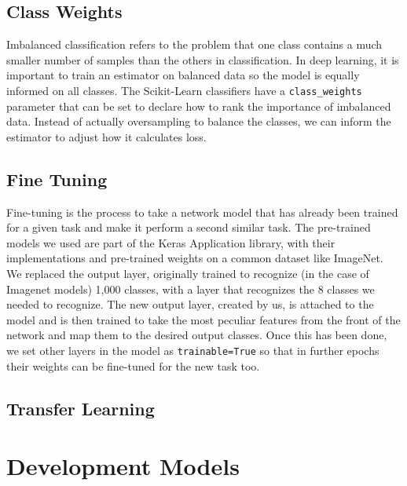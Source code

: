 \documentclass[11pt, oneside]{article}
\begin{document}
\subsection{Class Weights}
Imbalanced classification refers to the problem that one class contains a much smaller number of samples than the others in classification. In deep learning, it is important to train an estimator on balanced data so the model is equally informed on all classes. The Scikit-Learn classifiers have a \texttt{class\_weights} parameter that can be set to declare how to rank the importance of imbalanced data. Instead of actually oversampling to balance the classes, we can inform the estimator to adjust how it calculates loss.
\subsection{Fine Tuning}
Fine-tuning is the process to take a network model that has already been trained for a given task and make it perform a second similar task. The pre-trained models we used are part of the Keras Application library, with their implementations and pre-trained weights on a common dataset like ImageNet. \\
We replaced the output layer, originally trained to recognize (in the case of Imagenet models) 1,000 classes, with a layer that recognizes the 8 classes we needed to recognize.
The new output layer, created by us, is attached to the model and is then trained to take the most peculiar features from the front of the network and map them to the desired output classes.
Once this has been done, we set other layers in the model as \texttt{trainable=True} so that in further epochs their weights can be fine-tuned for the new task too.

\subsection{Transfer Learning}
\section{Development Models}
\end{document}
